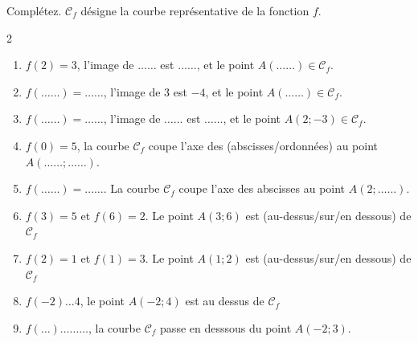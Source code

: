 \documentclass[main.tex]{subfiles}
\begin{document}
\begin{exercise}Complétez. $\mathscr{C}_f$ désigne la courbe représentative de la fonction $f$.
	\vspace{-0.5em}
	\begin{spacing}{2} 
		\begin{enumerate}[label=\arabic*),leftmargin =*]  
			\item $f(2)=3$, l'image de $\ldots\ldots$ est $\ldots\ldots$, et le point $A(\ldots\ldots)\in\mathscr{C}_f$.
			\item $f(\ldots\ldots)=\ldots\ldots$, l'image de $3$ est $-4$, et le point $A(\ldots\ldots)\in\mathscr{C}_f$.
			\item $f(\ldots\ldots)=\ldots\ldots$, l'image de $\ldots\ldots$ est $\ldots\ldots$, et le point $A(2;-3)\in\mathscr{C}_f$.
			\item $f(0)=5$, la courbe $\mathscr{C}_f$ coupe l'axe des (abscisses/ordonnées) au point $A(\ldots\ldots;\ldots\ldots)$.
			\item $f(\ldots\ldots)=\ldots\ldots$. La courbe  $\mathscr{C}_f$ coupe l'axe des abscisses au point $A(2;\ldots\ldots)$.
			\item $f(3)=5$ et $f(6)=2$. Le point $A(3;6)$ est (au-dessus/sur/en dessous) de $\mathscr{C}_f$ 
			\item $f(2)=1$ et $f(1)=3$. Le point $A(1;2)$ est (au-dessus/sur/en dessous) de $\mathscr{C}_f$
			\item $f(-2)\ldots 4$, le point $A(-2;4)$ est au dessus de  $\mathscr{C}_f$
			\item $f(\ldots)\ldots\ldots\ldots$, la courbe $\mathscr{C}_f$ passe en desssous du point $A(-2;3)$.
		\end{enumerate} 
	\end{spacing}
\end{exercise}
\vspace{-1em} 
\end{document}
